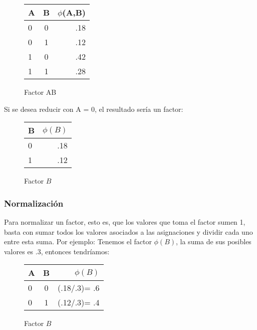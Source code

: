 \begin{figure}[H]
  \begin{center}
    \begin{tabular}{ l  c | r }
      A & B & $\phi$(A,B)\\ \hline
      0 & 0 & .18  \\ \hline
      0 & 1 & .12  \\ \hline
      1 & 0 & .42  \\ \hline
      1 & 1 & .28  \\
    \end{tabular}
  \end{center}
  \caption{Factor AB}
\end{figure}

\noindent Si se desea reducir con A = 0, el resultado sería un factor:

\begin{figure}[h]
  \begin{center}
    \begin{tabular}{ l | r }
      B & \(\phi(B)\)\\ \hline
      0 & .18  \\ \hline
      1 & .12  \\
    \end{tabular}
  \end{center}
  \caption{Factor \(B\)}
\end{figure}

\subsubsection{Normalización}
Para normalizar un factor, esto es, que los valores que toma el factor sumen 1, basta con sumar todos los valores asociados a las asignaciones y dividir cada uno entre esta suma. Por ejemplo: Tenemos el factor \(\phi(B)\), la suma de sus posibles valores es .3, entonces tendríamos:

\begin{figure}[H]
  \begin{center}
    \begin{tabular}{ l  c | r }
      A & B &  \(\phi(B)\)\\ \hline
      0 & 0 & (.18/.3)= .6  \\ \hline
      0 & 1 & (.12/.3)= .4 \\
    \end{tabular}
  \end{center}
  \caption{Factor \(B\)}
\end{figure}

